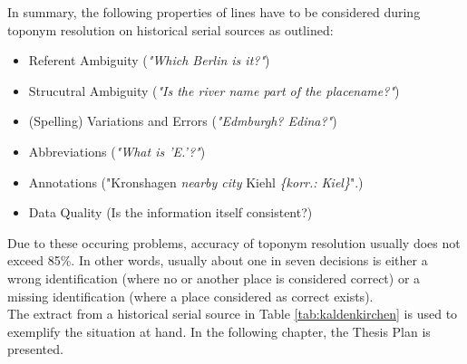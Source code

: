 \documentclass[11pt]{article}
\begin{document}
In summary, the following properties of lines have to be considered during toponym resolution on historical serial sources as outlined:

\begin{itemize}
\item Referent Ambiguity (\emph{"Which Berlin is it?"})
\item Strucutral Ambiguity (\emph{"Is the river name part of the placename?"})
\item (Spelling) Variations and Errors (\emph{"Edmburgh? Edina?"})
\item Abbreviations (\emph{"What is 'E.'?"})
\item Annotations ("Kronshagen \emph{nearby city} Kiehl \emph{\{korr.: Kiel\}}".)
\item Data Quality (Is the information itself consistent?)
\end{itemize}

Due to these occuring problems, accuracy of toponym resolution usually does not exceed 85\%. \cite{buscaldi11} In other words, usually about one in seven decisions is either a wrong identification (where no or another place is considered correct) or a missing identification (where a place considered as correct exists).\\

The extract from a historical serial source in Table \ref{tab:kaldenkirchen} is used to exemplify the situation at hand. In the following chapter, the Thesis Plan is presented.
\end{document}
